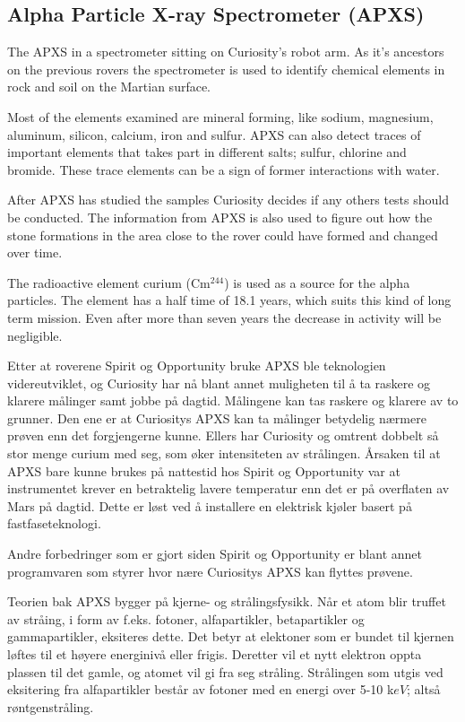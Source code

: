 \subsection*{Alpha Particle X-ray Spectrometer (APXS)}
The APXS in a spectrometer sitting on Curiosity's robot arm.
As it's ancestors on the previous rovers the spectrometer is used to identify chemical elements in rock and soil on the Martian surface.

Most of the elements examined are mineral forming, like sodium, magnesium, aluminum, silicon, calcium, iron and sulfur.
APXS can also detect traces of important elements that takes part in different salts; sulfur, chlorine and bromide.
These trace elements can be a sign of former interactions with water.

After APXS has studied the samples Curiosity decides if any others tests should be conducted.
The information from APXS is also used to figure out how the stone formations in the area close to the rover could have formed and changed over time.

The radioactive element curium (Cm$^{244}$) is used as a source for the alpha particles.
The element has a half time of 18.1 years, which suits this kind of long term mission.
Even after more than seven years the decrease in activity will be negligible.




Etter at roverene Spirit og Opportunity bruke APXS ble teknologien videreutviklet, og Curiosity har nå blant annet muligheten til å ta raskere og klarere målinger samt jobbe på dagtid.
Målingene kan tas raskere og klarere av to grunner.
Den ene er at Curiositys APXS kan ta målinger betydelig nærmere prøven enn det forgjengerne kunne.
Ellers har Curiosity og omtrent dobbelt så stor menge curium med seg, som øker intensiteten av strålingen.
Årsaken til at APXS bare kunne brukes på nattestid hos Spirit og Opportunity var at instrumentet krever en betraktelig lavere temperatur enn det er på overflaten av Mars på dagtid.
Dette er løst ved å installere en elektrisk kjøler basert på fastfaseteknologi.

Andre forbedringer som er gjort siden Spirit og Opportunity er blant annet programvaren som styrer hvor nære Curiositys APXS kan flyttes prøvene.

Teorien bak APXS bygger på kjerne- og strålingsfysikk.
Når et atom blir truffet av stråing, i form av f.eks. fotoner, alfapartikler, betapartikler og gammapartikler, eksiteres dette.
Det betyr at elektoner som er bundet til kjernen løftes til et høyere energinivå eller frigis.
Deretter vil et nytt elektron oppta plassen til det gamle, og atomet vil gi fra seg stråling.
Strålingen som utgis ved eksitering fra alfapartikler består av fotoner med en energi over 5-10 k$eV$; altså røntgenstråling.

